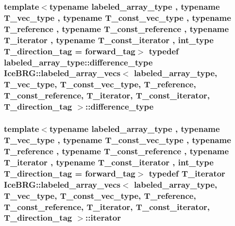 \subsubsection[{difference\+\_\+type}]{\setlength{\rightskip}{0pt plus 5cm}template$<$typename labeled\+\_\+array\+\_\+type , typename T\+\_\+vec\+\_\+type , typename T\+\_\+const\+\_\+vec\+\_\+type , typename T\+\_\+reference , typename T\+\_\+const\+\_\+reference , typename T\+\_\+iterator , typename T\+\_\+const\+\_\+iterator , int\+\_\+type T\+\_\+direction\+\_\+tag = forward\+\_\+tag$>$ typedef labeled\+\_\+array\+\_\+type\+::difference\+\_\+type {\bf Ice\+B\+R\+G\+::labeled\+\_\+array\+\_\+vecs}$<$ labeled\+\_\+array\+\_\+type, T\+\_\+vec\+\_\+type, T\+\_\+const\+\_\+vec\+\_\+type, T\+\_\+reference, T\+\_\+const\+\_\+reference, T\+\_\+iterator, T\+\_\+const\+\_\+iterator, T\+\_\+direction\+\_\+tag $>$\+::{\bf difference\+\_\+type}}\label{classIceBRG_1_1labeled__array__vecs_ab3914361470feba7994ebc0f84ea683b}
\hypertarget{classIceBRG_1_1labeled__array__vecs_a989cbe0a7bc0b96a206c52ddd3513a23}{}
\subsubsection[{iterator}]{\setlength{\rightskip}{0pt plus 5cm}template$<$typename labeled\+\_\+array\+\_\+type , typename T\+\_\+vec\+\_\+type , typename T\+\_\+const\+\_\+vec\+\_\+type , typename T\+\_\+reference , typename T\+\_\+const\+\_\+reference , typename T\+\_\+iterator , typename T\+\_\+const\+\_\+iterator , int\+\_\+type T\+\_\+direction\+\_\+tag = forward\+\_\+tag$>$ typedef T\+\_\+iterator {\bf Ice\+B\+R\+G\+::labeled\+\_\+array\+\_\+vecs}$<$ labeled\+\_\+array\+\_\+type, T\+\_\+vec\+\_\+type, T\+\_\+const\+\_\+vec\+\_\+type, T\+\_\+reference, T\+\_\+const\+\_\+reference, T\+\_\+iterator, T\+\_\+const\+\_\+iterator, T\+\_\+direction\+\_\+tag $>$\+::{\bf iterator}}\label{classIceBRG_1_1labeled__array__vecs_a989cbe0a7bc0b96a206c52ddd3513a23}
\hypertarget{classIceBRG_1_1labeled__array__vecs_a2bbe62200750107fc665bd86753bff4f}{}
